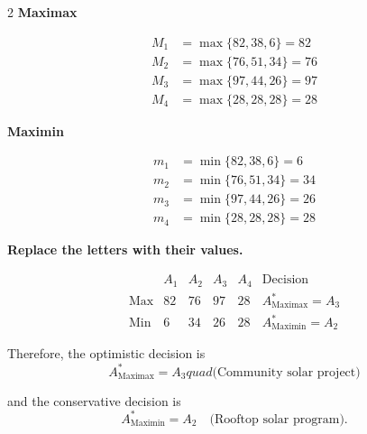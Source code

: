 {\begin{multicols}{2}
			\textbf{Maximax}
			
			\[
			\begin{array}{ll}
				M_1 &= \max\{82,38,6\}=82\\
				M_2 &= \max\{76,51,34\}=76\\
				M_3 &= \max\{97,44,26\}=97\\
				M_4 &= \max\{28,28,28\}=28
			\end{array}
			\]
			
			\textbf{Maximin}
			
			\[
			\begin{array}{ll}
				m_1 &= \min\{82,38,6\}=6\\
				m_2 &= \min\{76,51,34\}=34\\
				m_3 &= \min\{97,44,26\}=26\\
				m_4 &= \min\{28,28,28\}=28
			\end{array}
			\]
			
			\columnbreak
			
			\textbf{Replace the letters with their values.}
			
			\[
			\begin{array}{c|ccccc}
				& A_1 & A_2 & A_3 & A_4 & \text{Decision}\\
				\hline
				\text{Max} &
				82 & 76 & 97 & 28 &
				A^*_{\mathrm{Maximax}}=A_3
				\\
				\text{Min} &
				6 & 34 & 26 & 28 &
				A^*_{\mathrm{Maximin}}=A_2
			\end{array}
			\]
			
			Therefore, the optimistic decision is
			\[
			A^*_{\mathrm{Maximax}}=A_3
			quad\text{(Community solar project)}
			\]
			
			and the conservative decision is
			\[
			A^*_{\mathrm{Maximin}}=A_2
			\quad\text{(Rooftop solar program)}.
			\]
			
		\end{multicols}
		
	}
	
